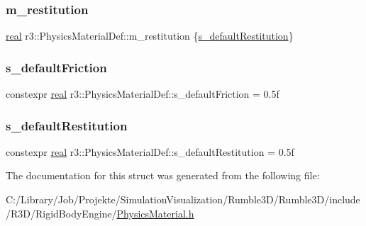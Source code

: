 \subsubsection{\texorpdfstring{m\+\_\+restitution}{m\_restitution}}
{\footnotesize\ttfamily \mbox{\hyperlink{namespacer3_ab2016b3e3f743fb735afce242f0dc1eb}{real}} r3\+::\+Physics\+Material\+Def\+::m\+\_\+restitution \{\mbox{\hyperlink{structr3_1_1_physics_material_def_a994308068cb88f266dd5f9f63f320add}{s\+\_\+default\+Restitution}}\}}

\mbox{\label{structr3_1_1_physics_material_def_a491a5e29b693bd20a7a8708f13c7f473}} 
\subsubsection{\texorpdfstring{s\+\_\+default\+Friction}{s\_defaultFriction}}
{\footnotesize\ttfamily constexpr \mbox{\hyperlink{namespacer3_ab2016b3e3f743fb735afce242f0dc1eb}{real}} r3\+::\+Physics\+Material\+Def\+::s\+\_\+default\+Friction = 0.\+5f\hspace{0.3cm}{\ttfamily [static]}}

\mbox{\label{structr3_1_1_physics_material_def_a994308068cb88f266dd5f9f63f320add}} 
\subsubsection{\texorpdfstring{s\+\_\+default\+Restitution}{s\_defaultRestitution}}
{\footnotesize\ttfamily constexpr \mbox{\hyperlink{namespacer3_ab2016b3e3f743fb735afce242f0dc1eb}{real}} r3\+::\+Physics\+Material\+Def\+::s\+\_\+default\+Restitution = 0.\+5f\hspace{0.3cm}{\ttfamily [static]}}



The documentation for this struct was generated from the following file\+:\begin{DoxyCompactItemize}
\item 
C\+:/\+Library/\+Job/\+Projekte/\+Simulation\+Visualization/\+Rumble3\+D/\+Rumble3\+D/include/\+R3\+D/\+Rigid\+Body\+Engine/\mbox{\hyperlink{_physics_material_8h}{Physics\+Material.\+h}}\end{DoxyCompactItemize}
